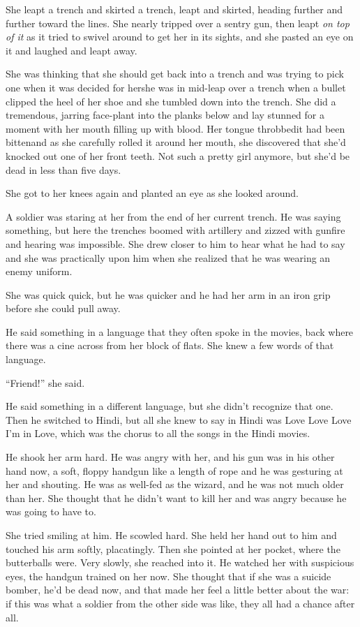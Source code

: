 She leapt a trench and skirted a trench, leapt and skirted, heading
further and further toward the lines. She nearly tripped over a
sentry gun, then leapt \emph{on top of it} as it tried to swivel
around to get her in its sights, and she pasted an eye on it and
laughed and leapt away.

She was thinking that she should get back into a trench and was
trying to pick one when it was decided for her\dash{}she was in mid-leap
over a trench when a bullet clipped the heel of her shoe and she
tumbled down into the trench. She did a tremendous, jarring
face-plant into the planks below and lay stunned for a moment with
her mouth filling up with blood. Her tongue throbbed\dash{}it had been
bitten\dash{}and as she carefully rolled it around her mouth, she
discovered that she’d knocked out one of her front teeth. Not such
a pretty girl anymore, but she’d be dead in less than five days.

She got to her knees again and planted an eye as she looked
around.

A soldier was staring at her from the end of her current trench. He
was saying something, but here the trenches boomed with artillery
and zizzed with gunfire and hearing was impossible. She drew closer
to him to hear what he had to say and she was practically upon him
when she realized that he was wearing an enemy uniform.

She was quick quick, but he was quicker and he had her arm in an
iron grip before she could pull away.

He said something in a language that they often spoke in the
movies, back where there was a cine across from her block of flats.
She knew a few words of that language.

“Friend!” she said.

He said something in a different language, but she didn’t recognize
that one. Then he switched to Hindi, but all she knew to say in
Hindi was Love Love Love I’m in Love, which was the chorus to all
the songs in the Hindi movies.

He shook her arm hard. He was angry with her, and his gun was in
his other hand now, a soft, floppy handgun like a length of rope
and he was gesturing at her and shouting. He was as well-fed as the
wizard, and he was not much older than her. She thought that he
didn’t want to kill her and was angry because he was going to have
to.

She tried smiling at him. He scowled hard. She held her hand out to
him and touched his arm softly, placatingly. Then she pointed at
her pocket, where the butterballs were. Very slowly, she reached
into it. He watched her with suspicious eyes, the handgun trained
on her now. She thought that if she was a suicide bomber, he’d be
dead now, and that made her feel a little better about the war: if
this was what a soldier from the other side was like, they all had
a chance after all.

